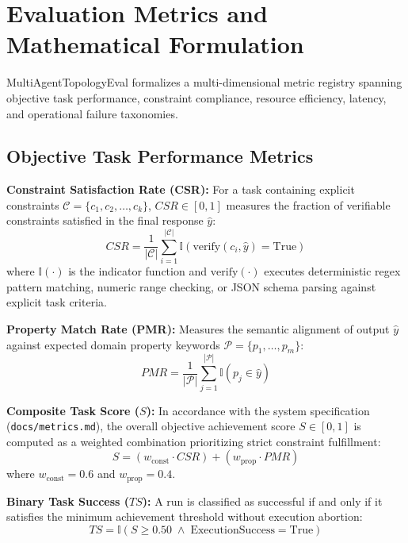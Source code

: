 \section{Evaluation Metrics and Mathematical Formulation}
\label{sec:metrics}

MultiAgentTopologyEval formalizes a multi-dimensional metric registry spanning objective task performance, constraint compliance, resource efficiency, latency, and operational failure taxonomies.

\subsection{Objective Task Performance Metrics}
\textbf{Constraint Satisfaction Rate (CSR):} For a task containing explicit constraints $\mathcal{C} = \{c_1, c_2, \dots, c_k\}$, $CSR \in [0, 1]$ measures the fraction of verifiable constraints satisfied in the final response $\hat{y}$:
\begin{equation}
CSR = \frac{1}{|\mathcal{C}|} \sum_{i=1}^{|\mathcal{C}|} \mathbb{I}\left(\text{verify}(c_i, \hat{y}) = \text{True}\right)
\end{equation}
where $\mathbb{I}(\cdot)$ is the indicator function and $\text{verify}(\cdot)$ executes deterministic regex pattern matching, numeric range checking, or JSON schema parsing against explicit task criteria.

\textbf{Property Match Rate (PMR):} Measures the semantic alignment of output $\hat{y}$ against expected domain property keywords $\mathcal{P} = \{p_1, \dots, p_m\}$:
\begin{equation}
PMR = \frac{1}{|\mathcal{P}|} \sum_{j=1}^{|\mathcal{P}|} \mathbb{I}\left(p_j \in \hat{y}\right)
\end{equation}

\textbf{Composite Task Score ($S$):} In accordance with the system specification (\texttt{docs/metrics.md}), the overall objective achievement score $S \in [0, 1]$ is computed as a weighted combination prioritizing strict constraint fulfillment:
\begin{equation}
S = (w_{\text{const}} \cdot CSR) + (w_{\text{prop}} \cdot PMR)
\end{equation}
where $w_{\text{const}} = 0.6$ and $w_{\text{prop}} = 0.4$.

\textbf{Binary Task Success ($TS$):} A run is classified as successful if and only if it satisfies the minimum achievement threshold without execution abortion:
\begin{equation}
TS = \mathbb{I}(S \ge 0.50 \;\land\; \text{ExecutionSuccess} = \text{True})
\end{equation}

